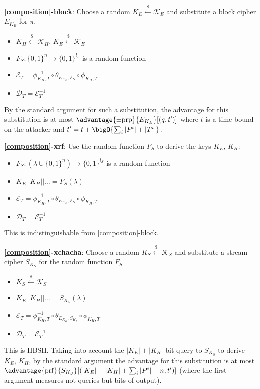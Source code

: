 \documentclass[journal=tosc,preprint,floatrow,submission]{iacrtrans}
\newcommand*{\xprm}[2]{\textsf{\ref*{#1}-#2}}
\newcommand*{\xprmtitle}[2]{\textbf{\xprm{#1}{#2}}}
\newcommand*{\calE}{\mathcal{E}}
\newcommand*{\calD}{\mathcal{D}}
\begin{document}
\xprmtitle{composition}{block}: Choose a random $K_E \xleftarrow{\$} \mathcal{K}_E$ and
substitute a block cipher $E_{K_E}$ for $\pi$.
\begin{itemize}
    \item $K_H \xleftarrow{\$} \mathcal{K}_H$, $K_E \xleftarrow{\$} \mathcal{K}_E$
    \item $F_S: \{0,1\}^n \rightarrow \{0,1\}^{l_S}$ is a random function
    \item $\calE_T = \phi^{-1}_{K_H, T} \circ \theta_{E_{K_E}, F_S} \circ \phi_{K_H, T}$
    \item $\calD_T = \calE_T^{-1}$
\end{itemize}

By the standard argument
for such a substitution, the advantage for this substitution is at most
$\advantage{\pm \mathrm{prp}}{E_{K_E}}[(q, t')]$ where $t$ is a time bound on the attacker and
$t' = t + \bigO{\sum_i |P^i| + |T^i|}$.

\xprmtitle{composition}{xrf}: Use the random function $F_S$ to derive the keys
$K_E$, $K_H$:

\begin{itemize}
    \item $F_S: (\lambda \cup \{0,1\}^n) \rightarrow \{0,1\}^{l_S}$ is a random function
    \item $K_E || K_H || \ldots = F_S(\lambda)$
    \item $\calE_T = \phi^{-1}_{K_H, T} \circ \theta_{E_{K_E}, F_S} \circ \phi_{K_H, T}$
    \item $\calD_T = \calE_T^{-1}$
\end{itemize}

This is indistinguishable from \xprm{composition}{block}.

\xprmtitle{composition}{xchacha}: Choose a random $K_S \xleftarrow{\$} \mathcal{K}_S$ and
substitute a stream cipher $S_{K_S}$ for the random function $F_S$

\begin{itemize}
    \item $K_S \xleftarrow{\$} \mathcal{K}_S$
    \item $K_E || K_H || \ldots = S_{K_S}(\lambda)$
    \item $\calE_T = \phi^{-1}_{K_H, T} \circ \theta_{E_{K_E}, S_{K_S}} \circ \phi_{K_H, T}$
    \item $\calD_T = \calE_T^{-1}$
\end{itemize}

This is HBSH. Taking into account the $|K_E| + |K_H|$-bit
query to $S_{K_S}$ to derive $K_E$, $K_H$,
by the standard argument the advantage for this substitution is at most
$\advantage{\mathrm{prf}}{S_{K_S}}[(|K_E| + |K_H| + \sum_i |P^i|-n, t')]$ (where
the first argument measures not queries but bits of output).
\end{document}
